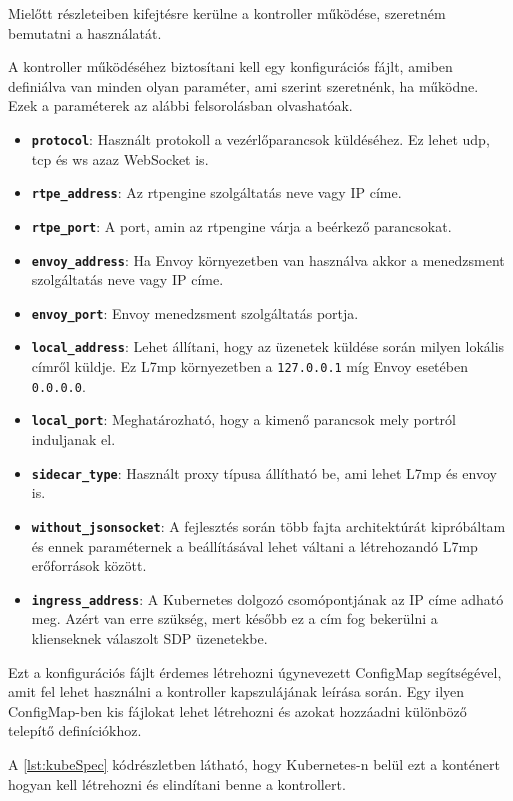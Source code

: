 Mielőtt részleteiben kifejtésre kerülne a kontroller működése, szeretném bemutatni a
használatát.

A kontroller működéséhez biztosítani kell egy konfigurációs fájlt, amiben definiálva
van minden olyan paraméter, ami szerint szeretnénk, ha működne. Ezek a paraméterek
az alábbi felsorolásban olvashatóak.

\begin{itemize}
	\item \textbf{\texttt{protocol}}: Használt protokoll a vezérlőparancsok küldéséhez. 
	Ez lehet udp, tcp és ws azaz WebSocket is.
	\item \textbf{\texttt{rtpe\_address}}: Az rtpengine szolgáltatás neve vagy IP címe. 
	\item \textbf{\texttt{rtpe\_port}}: A port, amin az rtpengine várja a beérkező 
	parancsokat. 
	\item \textbf{\texttt{envoy\_address}}: Ha Envoy környezetben van használva akkor a 
	menedzsment szolgáltatás neve vagy IP címe. 
	\item \textbf{\texttt{envoy\_port}}: Envoy menedzsment szolgáltatás portja. 
	\item \textbf{\texttt{local\_address}}: Lehet állítani, hogy az üzenetek küldése 
	során milyen lokális címről küldje. Ez L7mp környezetben a \texttt{127.0.0.1} míg 
	Envoy esetében \texttt{0.0.0.0}.
	\item \textbf{\texttt{local\_port}}: Meghatározható, hogy a kimenő parancsok mely 
	portról induljanak el. 
	\item \textbf{\texttt{sidecar\_type}}: Használt proxy típusa állítható be, ami lehet 
	L7mp és envoy is.
	\item \textbf{\texttt{without\_jsonsocket}}: A fejlesztés során több fajta 
	architektúrát kipróbáltam és ennek paraméternek a beállításával lehet váltani a 
	létrehozandó L7mp erőforrások között. 
	\item \textbf{\texttt{ingress\_address}}: A Kubernetes dolgozó csomópontjának az IP 
	címe adható meg. Azért van erre szükség, mert később ez a cím fog bekerülni a 
	klienseknek válaszolt SDP üzenetekbe. 
\end{itemize}

Ezt a konfigurációs fájlt érdemes létrehozni úgynevezett ConfigMap segítségével, amit 
fel lehet használni a kontroller kapszulájának leírása során. Egy ilyen ConfigMap-ben kis 
fájlokat lehet létrehozni és azokat hozzáadni különböző telepítő definíciókhoz. 

A \ref{lst:kubeSpec} kódrészletben látható, hogy Kubernetes-n belül ezt a konténert 
hogyan kell létrehozni és elindítani benne a kontrollert. 

